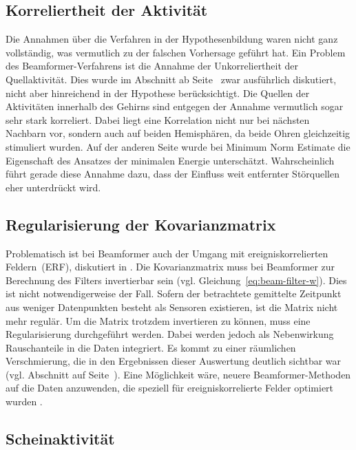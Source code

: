 \documentclass[doc,a4paper,12pt]{apa6}
\makeatletter
\DeclareRobustCommand*{\nameref}[1]{%
      \glqq{\myorg@nameref{#1}}\grqq%
    }%
\makeatother
\begin{document}
\subsection{Korreliertheit der Aktivität}

Die Annahmen über die Verfahren in der Hypothesenbildung waren nicht ganz vollständig, was vermutlich zu der falschen Vorhersage geführt hat. Ein Problem des Beamformer-Verfahrens ist die Annahme der Unkorreliertheit der Quellaktivität. Dies wurde im Abschnitt \nameref{sec:beam} ab Seite~\pageref{sec:beam} zwar ausführlich diskutiert, nicht aber hinreichend in der Hypothese berücksichtigt. Die Quellen der Aktivitäten innerhalb des Gehirns sind entgegen der Annahme vermutlich sogar sehr stark korreliert. Dabei liegt eine Korrelation nicht nur bei nächsten Nachbarn vor, sondern auch auf beiden Hemisphären, da beide Ohren gleichzeitig stimuliert wurden. Auf der anderen Seite wurde bei Minimum Norm Estimate die Eigenschaft des Ansatzes der minimalen Energie unterschätzt. Wahrscheinlich führt gerade diese Annahme dazu, dass der Einfluss weit entfernter Störquellen eher unterdrückt wird.

\subsection{Regularisierung der Kovarianzmatrix}
\label{sec:regu-kov}

Problematisch ist bei Beamformer auch der Umgang mit ereigniskorrelierten Feldern~(ERF), diskutiert in \textcite{hansen2010meg}. Die Kovarianzmatrix muss bei Beamformer zur Berechnung des Filters invertierbar sein (vgl. Gleichung~\ref{eq:beam-filter-w}). Dies ist nicht notwendigerweise der Fall. Sofern der betrachtete gemittelte Zeitpunkt aus weniger Datenpunkten besteht als Sensoren existieren, ist die Matrix nicht mehr regulär. Um die Matrix trotzdem invertieren zu können, muss eine Regularisierung durchgeführt werden. Dabei werden jedoch als Nebenwirkung Rauschanteile in die Daten integriert. Es kommt zu einer räumlichen Verschmierung, die in den Ergebnissen dieser Auswertung deutlich sichtbar war (vgl. Abschnitt \nameref{sec:akti-verteilung} auf Seite~\pageref{sec:akti-verteilung}). Eine Möglichkeit wäre, neuere Beamformer-Methoden auf die Daten anzuwenden, die speziell für ereigniskorrelierte Felder optimiert wurden \parencite[z.B.][]{cheyne2007event}.

\subsection{Scheinaktivität}
\end{document}
